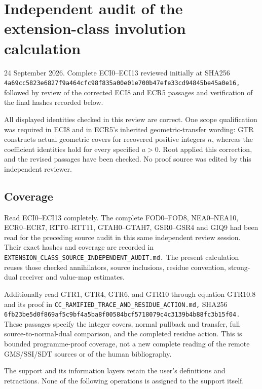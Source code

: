 \section{Independent audit of the extension-class involution
calculation}\label{independent-audit-of-the-extension-class-involution-calculation}

24 September 2026. Complete ECI0--ECI13 reviewed initially at SHA256
\nolinkurl{4a69cc5823e6827f9a464cfc98f835a00e01e700b47efe33cd94845be45a0e16,}
followed by review of the corrected ECI8 and ECR5 passages and
verification of the final hashes recorded below.

All displayed identities checked in this review are correct. One scope
qualification was required in ECI8 and in ECR5's inherited
geometric-transfer wording: GTR constructs actual geometric covers for
recovered positive integers \(n\), whereas the coefficient identities
hold for every specified \(a>0\). Root applied this correction, and the
revised passages have been checked. No proof source was edited by this
independent reviewer.

\subsection{Coverage}\label{coverage}

Read ECI0--ECI13 completely. The complete FOD0--FOD8, NEA0--NEA10,
ECR0--ECR7, RTT0--RTT11, GTAH0--GTAH7, GSR0--GSR4 and GIQ9 had been read
for the preceding source audit in this same independent review session.
Their exact hashes and coverage are recorded in
\nolinkurl{EXTENSION_CLASS_SOURCE_INDEPENDENT_AUDIT.md.} The present
calculation reuses those checked annihilators, source inclusions,
residue convention, strong-dual receiver and value-map estimates.

Additionally read GTR1, GTR4, GTR6, and GTR10 through equation GTR10.8
and its proof in \nolinkurl{CC_RAMIFIED_TRACE_AND_RESIDUE_ACTION.md,}
SHA256
\nolinkurl{6fb23be5d0f869af5c9bf4a5ba8f00584bcf5718079c4c3139b4b88fc3b15f04.}
These passages specify the integer covers, normal pullback and transfer,
full source-to-normal-dual comparison, and the completed residue action.
This is bounded programme-proof coverage, not a new complete reading of
the remote GMS/SSI/SDT sources or of the human bibliography.

The support and its information layers retain the user's definitions and
retractions. None of the following operations is assigned to the support
itself.

